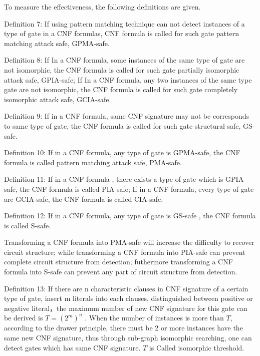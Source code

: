 \documentclass[runningheads,a4paper]{llncs}
\begin{document}
To measure the effectiveness, the following definitions are given.

\noindent \newline Definition 7: If using pattern matching technique can not detect instances of a type of gate in a CNF formulas, 
CNF formula is called for such gate pattern matching attack safe, GPMA-safe.

\noindent \newline Definition 8: If In a CNF formula, some instances of the same type of gate are not isomorphic,
the CNF formula is called for such gate partially isomorphic attack safe, GPIA-safe; If In a CNF formula,
any two instances of the same type gate are not isomorphic, the CNF formula is called for such gate completely isomorphic attack safe, GCIA-safe.

\noindent \newline Definition 9: If in a CNF formula, same CNF signature may not be corresponds to same type of gate, the CNF formula is called for such gate structural safe, GS-safe.

\noindent \newline Definition 10: If in a CNF formula, any type of gate is GPMA-safe, the CNF formula is called pattern matching attack safe, PMA-safe.

\noindent \newline Definition 11: If in a CNF formula , there exists a type of gate which is GPIA-safe,
the CNF formula is called PIA-safe; If in a CNF formula, every type of gate are GCIA-safe, the CNF formula is called CIA-safe.

\noindent \newline Definition 12: If in a CNF formula, any type of gate is GS-safe , the CNF formula is called S-safe. \noindent \newline {}  

Transforming a CNF formula into PMA-safe will increase the difficulty to recover circuit structure; 
while transforming a CNF formula into PIA-safe can prevent complete circuit structure from detection; 
futhermore  transforming a CNF formula into S-safe can prevent any part of circuit structure from detection.

\noindent \newline Definition 13: If there are n characteristic clauses in CNF signature of a certain type of gate, insert m literals into each clauses, 
distinguished between positive or negative literal，the maximum number of new CNF signature for this gate can be derived is $T=(2^m)^n$ .
When the number of instances is more than $T$, according to the drawer principle, 
there must be 2 or more instances have the same new CNF signature, 
thus through sub-graph isomorphic searching, one can detect gates which has same CNF signature.
$T$ is Called isomorphic threshold.
\end{document}
